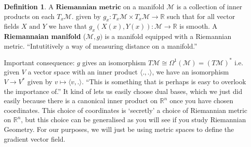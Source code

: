 \documentclass[10pt]{article}
\theoremstyle{plain}
\theoremstyle{definition}
\newtheorem{defn}[thm]{Definition} %
\newcommand{\myand}{\text{ and }}
\newcommand{\Real}{\mathbb{R}}
\newcommand{\man}{\mathcal{M}}
\newcommand{\tang}{T_x\man}
\newcommand{\tangbundle}{T\man}
\begin{document}
\begin{defn}
    A $\textbf{Riemannian metric}$ on a manifold $\man$ is a collection of inner products on  each $\tang$. given by $g_x:\tang\times\tang \to \Real$ such that for all vector fields $X \myand Y$ we have that $g_x(X(x),Y(x)): \man \to \Real$ is smooth. A \textbf{Riemannaian manifold} ($\man,g)$ is a manifold equipped with a Riemannian metric. ``Intutitively a way of measuring distance on a manifold.''
\end{defn}
Important consequence: $g$ gives an isomorphism $\tangbundle \cong \Omega^1(\man) = (\tangbundle)^*$ i.e. given $V$ a vector space with an inner product $\langle . , .\rangle$, we have an isomorphism $V\to V^*$ given by $v\mapsto \langle v, .\rangle$. ``This is something that is perhaps is easy to overlook the importance of.'' It kind of lets us easily choose dual bases, which we just did easily because there is a canonical inner product on $\Real^n$ once you have chosen coordinates. This choice of coordinates is `secretly' a choice of Riemannian metric on $\Real^n$, but this choice can be generalised as you will see if you study Riemannian Geometry. For our purposes, we will just be using metric spaces to define the gradient vector field. 
\end{document}

